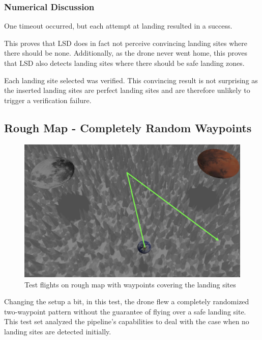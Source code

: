        \subsubsection{Numerical Discussion}
        One timeout occurred, but each attempt at landing resulted in a success. 

        This proves that LSD does in fact not perceive convincing landing sites where there should be none. Additionally, as the drone never went home, this proves that LSD also detects landing sites where there should be safe landing zones.
        
        Each landing site selected was verified. This convincing result is not surprising as the inserted landing sites are perfect landing sites and are therefore unlikely to trigger a verification failure.

\subsection{Rough Map - Completely Random Waypoints}

    \begin{figure}[h]
        \centering
        \includegraphics[scale=0.24]{images/evaluation/rough_complete_rand.png}
        \caption{Test flights on rough map with waypoints covering the landing sites}
        \label{fig:rough_compl_rand}
    \end{figure}

    Changing the setup a bit, in this test, the drone flew a completely randomized two-waypoint pattern without the guarantee of flying over a safe landing site. This test set analyzed the pipeline's capabilities to deal with the case when no landing sites are detected initially.

